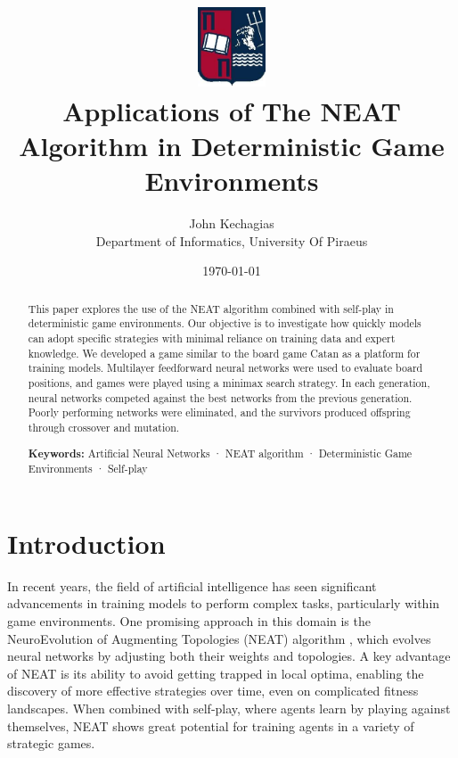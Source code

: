 \documentclass[letterpaper, 12pt]{article}
\title{
  \includegraphics[width=2cm]{unipi_logo.png}\\[1cm]
  Applications of The NEAT Algorithm in Deterministic Game Environments
}
\date{\today}
\author{John Kechagias\\ Department of Informatics, University Of Piraeus}
\begin{document}
\maketitle

\begin{abstract}
This paper explores the use of the NEAT algorithm combined with self-play in
deterministic game environments. Our objective is to investigate how quickly models can
adopt specific strategies with minimal reliance on training data and expert knowledge.
We developed a game similar to the board game Catan as a platform for training models.
Multilayer feedforward neural networks were used to evaluate board positions, and games
were played using a minimax search strategy. In each generation, neural networks
competed against the best networks from the previous generation. Poorly performing
networks were eliminated, and the survivors produced offspring through crossover and
mutation.

\parskip=0.5cm

\noindent\textbf{Keywords:} Artificial Neural Networks · NEAT algorithm · Deterministic
Game Environments · Self-play
\end{abstract}

\section{Introduction}
In recent years, the field of artificial intelligence has seen significant advancements
in training models to perform complex tasks, particularly within game environments. One
promising approach in this domain is the NeuroEvolution of Augmenting Topologies (NEAT)
algorithm \cite{stanley:ec02}, which evolves neural networks by adjusting both their
weights and topologies. A key advantage of NEAT is its ability to avoid getting trapped
in local optima, enabling the discovery of more effective strategies over time, even on
complicated fitness landscapes. When combined with self-play, where agents learn by
playing against themselves, NEAT shows great potential for training agents in a variety
of strategic games.
\end{document}
